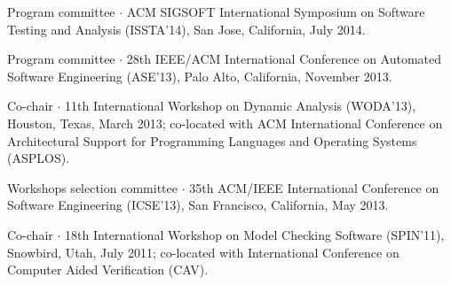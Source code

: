 \documentclass[ComputerScience]{vita}
\begin{document}
\begin{vita}
\begin{Panel and Committee Service}
\item Program committee $\cdot$ ACM SIGSOFT International Symposium on Software Testing and Analysis (ISSTA'14), San Jose, California, July 2014.
\item Program committee $\cdot$ 28th IEEE/ACM International Conference on Automated Software Engineering (ASE'13), Palo Alto, California, November 2013.
\item Co-chair $\cdot$ 11th International Workshop on Dynamic Analysis (WODA'13), Houston, Texas, March 2013; co-located with ACM International Conference on Architectural Support for Programming Languages and Operating Systems (ASPLOS).
\item Workshops selection committee $\cdot$ 35th ACM/IEEE International Conference on Software Engineering (ICSE'13), San Francisco, California, May 2013.
\item Co-chair $\cdot$ 18th International Workshop on Model Checking Software (SPIN'11), Snowbird, Utah, July 2011; co-located with International Conference on Computer Aided Verification (CAV).

\end{Panel and Committee Service}
\end{vita}
\end{document}
